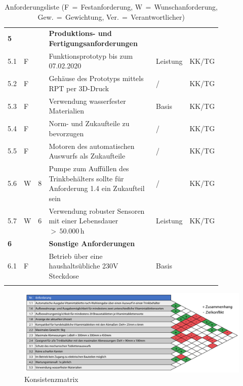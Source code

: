 \begin{longtable}{C{0.03\linewidth}C{0.05\linewidth}C{0.05\linewidth}L{0.5\linewidth}C{0.14\linewidth}C{0.07\linewidth}}
	\midrule
	
	\textbf{5} & & & \textbf{Produktions- und Fertigungsanforderungen}&& \\
	5.1 & F & & Funktionsprototyp bis zum 07.02.2020 & Leistung & KK/TG\\
	5.2 & F & & Gehäuse des Prototyps mittels RPT per 3D-Druck & / & KK/TG\\
	5.3 & F & & Verwendung wasserfester Materialien &Basis& KK/TG\\
	5.4 & F & & Norm- und Zukaufteile zu bevorzugen & / & KK/TG\\
	5.5 & F & & Motoren des automatischen Auswurfs als Zukaufteile & / & KK/TG\\
	5.6 & W & 8 & Pumpe zum Auffüllen des Trinkbehälters sollte für Anforderung 1.4 ein Zukaufteil sein & / & KK/TG\\
	5.7 & W & 6 & Verwendung robuster Sensoren mit einer Lebensdauer $>\, 50.000\,$h & Leistung & KK/TG\\
	
	\midrule
	
	\textbf{6} & & & \textbf{Sonstige Anforderungen} &&\\
	6.1 & F & & Betrieb über eine haushaltsübliche 230V Steckdose & Basis &\\
	
	\bottomrule
	
	\caption{Anforderungsliste (F$\,=\,$Festanforderung, W$\,=\,$Wunschanforderung, Gew.$\,=\,$Gewichtung, Ver.$\,=\,$Verantwortlicher)}
	\label{anforderungsliste}
\end{longtable}

\begin{figure}[H]
	\centering
	\includegraphics[width=1.0\linewidth]{chapter/Bilder/konsistenzmatrix}
	\caption{Konsistenzmatrix}
	\label{fig:konsistenzmatrix}
\end{figure}

